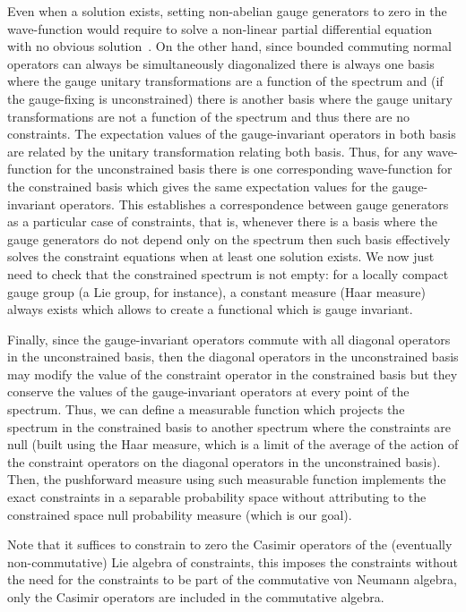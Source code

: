 \documentclass[11pt]{book}
\begin{document}
Even when a solution exists, setting non-abelian gauge generators to
zero in the wave-function would require to solve a non-linear partial
differential equation with no obvious
solution~\cite{Salmela2005Gaussux2019s}\cite{Ferreira2012Integral}\cite{Chru1987Some}\cite{Gomes2019unified}. On
the other hand, since bounded commuting normal operators can always be
simultaneously
diagonalized\cite{schmuxfcdgen2012unbounded} there is always one basis where the gauge unitary transformations
are a function of the spectrum and (if the gauge-fixing is
unconstrained) there is another basis where the gauge unitary
transformations are not a function of the spectrum and thus there are no
constraints. The expectation values of the gauge-invariant operators in
both basis are related by the unitary transformation relating both
basis. Thus, for any wave-function for the unconstrained basis there is
one corresponding wave-function for the constrained basis which gives
the same expectation values for the gauge-invariant operators. This
establishes a correspondence between gauge generators as a particular
case of constraints, that is, whenever there is a basis where the gauge
generators do not depend only on the spectrum then such basis
effectively solves the constraint equations when at least one solution
exists. We now just need to check that the constrained spectrum is not
empty: for a locally compact gauge group (a Lie group, for instance), a
constant measure (Haar measure) always exists which allows to create a
functional which is gauge invariant.

Finally, since the gauge-invariant operators commute with all diagonal
operators in the unconstrained basis, then the diagonal operators in the
unconstrained basis may modify the value of the constraint operator in
the constrained basis but they conserve the values of the
gauge-invariant operators at every point of the spectrum. Thus, we can
define a measurable function which projects the spectrum in the
constrained basis to another spectrum where the constraints are null
(built using the Haar measure, which is a limit of the average of the
action of the constraint operators on the diagonal operators in the
unconstrained basis). Then, the pushforward measure using such
measurable function implements the exact constraints in a separable
probability space without attributing to the constrained space null
probability measure (which is our goal).

Note that it suffices to constrain to zero the Casimir operators of the
(eventually non-commutative) Lie algebra of constraints, this imposes
the constraints without the need for the constraints to be part of the
commutative von Neumann algebra, only the Casimir operators are included
in the commutative algebra.
\end{document}
